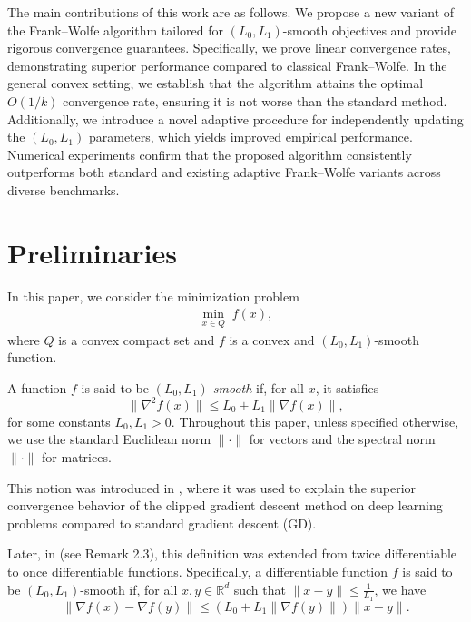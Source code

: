 \documentclass[runningheads]{llncs}
\begin{document}
	The main contributions of this work are as follows. We propose a new variant of the Frank--Wolfe algorithm tailored for $(L_0, L_1)$-smooth objectives and provide rigorous convergence guarantees. Specifically, we prove linear convergence rates, demonstrating superior performance compared to classical Frank--Wolfe. In the general convex setting, we establish that the algorithm attains the optimal $O(1/k)$ convergence rate, ensuring it is not worse than the standard method. Additionally, we introduce a novel adaptive procedure for independently updating the $(L_0, L_1)$ parameters, which yields improved empirical performance. Numerical experiments confirm that the proposed algorithm consistently outperforms both standard and existing adaptive Frank--Wolfe variants across diverse benchmarks.
	
	\section{Preliminaries}
	
	In this paper, we consider the minimization problem
	\begin{align}
		\min_{x \in Q} \; f(x),
	\end{align}
	where $Q$ is a convex compact set and $f$ is a convex and $(L_0,L_1)$-smooth function.
	
	\begin{definition}
		A function $f$ is said to be \emph{$(L_0,L_1)$-smooth} if, for all $x$, it satisfies
		\begin{equation}\label{def:l0_l1_twice_dif}
			\| \nabla^2 f(x) \| \leq L_0 + L_1 \| \nabla f(x) \|,
		\end{equation}
		for some constants $L_0, L_1 > 0$. Throughout this paper, unless specified otherwise, we use the standard Euclidean norm $\|\cdot\|$ for vectors and the spectral norm $\|\cdot\|$ for matrices.
	\end{definition}
	
	This notion was introduced in \cite{zhang2019gradient}, where it was used to explain the superior convergence behavior of the clipped gradient descent method on deep learning problems compared to standard gradient descent (GD).
	
	Later, in \cite{zhang2020improved} (see Remark 2.3), this definition was extended from twice differentiable to once differentiable functions. Specifically, a differentiable function $f$ is said to be $(L_0, L_1)$-smooth if, for all $x, y \in \mathbb{R}^d$ such that $\| x - y \| \leq \frac{1}{L_1}$, we have
	\begin{equation}\label{def:l0_l1}
		\|\nabla f(x) - \nabla f(y)\| \le (L_0 + L_1 \|\nabla f(y)\|)\|x - y\|.
	\end{equation}
	
\end{document}
